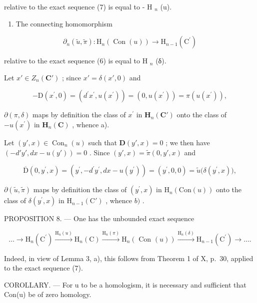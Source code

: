 relative to the exact sequence (7) is equal to - H \(_{n}\) (u).

\begin{enumerate}
\def\labelenumi{\alph{enumi})}
\setcounter{enumi}{1}
\tightlist
\item
  The connecting homomorphism
\end{enumerate}

\[
\partial_ {n} (\tilde {u}, \tilde {\pi}): \mathrm{H} _ {n} (\operatorname{Con} (u)) \rightarrow \mathrm{H} _ {n - 1} (\mathrm{C} ^ {\prime})
\]

relative to the exact sequence (6) is equal to H \(_{n}\) (δ).

Let \(x' \in Z_n(\mathbf{C}')\) ; since \(x' = \delta(x', 0)\) and

\[
- \mathrm{D} (x ^ {\prime}, 0) = (d ^ {\prime} x ^ {\prime}, u (x ^ {\prime})) = (0, u (x ^ {\prime})) = \pi (u (x ^ {\prime})),
\]

\(\partial (\pi ,\delta)\) maps by definition the class of \(x^{\prime}\) in \(\mathbf{H}_n(\mathbf{C}')\) onto the class of \(-u(x^{\prime})\) in \(\mathbf{H}_n(\mathbf{C})\) , whence a).

Let \((y', x) \in \operatorname{Con}_n(u)\) such that \(\mathbf{D}(y', x) = 0\) ; we then have \((-d'y', dx - u(y')) = 0\) . Since \((y', x) = \tilde{\pi}(0, y', x)\) and

\[
\overline {{{\mathrm{D}}}} (0, y ^ {\prime}, x) = \left(y ^ {\prime}, - d ^ {\prime} y ^ {\prime}, d x - u (y ^ {\prime})\right) = \left(y ^ {\prime}, 0, 0\right) = \tilde {u} \big (\delta (y ^ {\prime}, x) \big),
\]

\(\partial (\tilde{u},\tilde{\pi})\) maps by definition the class of \((y^{\prime},x)\) in \(\mathrm{H}_n(\mathrm{Con}(u))\) onto the class of \(\delta (y^{\prime},x)\) in \(\mathrm{H}_{n - 1}(\mathrm{C}')\) , whence \(b)\) .

PROPOSITION 8. --- One has the unbounded exact sequence

\[
\dots \longrightarrow \mathrm{H} _ {n} (\mathrm{C} ^ {\prime}) \xrightarrow {\mathrm{H} _ {n} (u)} \mathrm{H} _ {n} (\mathrm{C}) \xrightarrow {\mathrm{H} _ {n} (\pi)} \mathrm{H} _ {n} (\text { Con } (u)) \xrightarrow {\mathrm{H} _ {n} (\delta)} \mathrm{H} _ {n - 1} (\mathrm{C} ^ {\prime}) \longrightarrow \dots .\tag{8}
\]

Indeed, in view of Lemma 3, a), this follows from Theorem 1 of X, p.~30, applied to the exact sequence (7).

COROLLARY. --- For u to be a homologism, it is necessary and sufficient that Con(u) be of zero homology.

